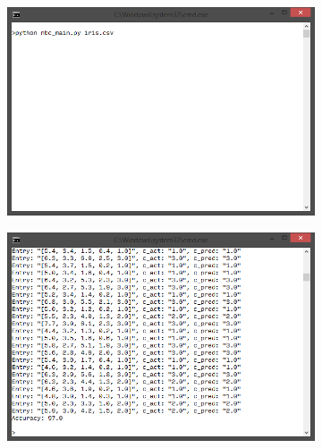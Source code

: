 \documentclass[
	a4paper,
	oneside,
	DIV = 12,
	fontsize = 13pt,
	headings = normal,
	numbers = endperiod,
	bibliography = totoc, %
]{scrartcl}
\theoremstyle{mythm}
\begin{document}
					\begin{figure}[!htbp]
						\centering
						\begin{subfigure}[b]{0.5\columnwidth - 0.5em}
							\centering
							\includegraphics[width = \columnwidth]{./assets/y03s01-syssoft-term-paper-01-p01.png}
							\caption{}
							\label{subfig:nbc-usage}
						\end{subfigure}\quad%
						\begin{subfigure}[b]{0.5\columnwidth - 0.5em}
							\centering
							\includegraphics[width = \columnwidth]{./assets/y03s01-syssoft-term-paper-01-p02.png}
							\caption{}
							\label{subfig:nbc-res-01}
						\end{subfigure}
						\begin{subfigure}[b]{0.5\columnwidth - 0.5em}
							\centering

\end{subfigure}
\end{figure}
\end{document}
